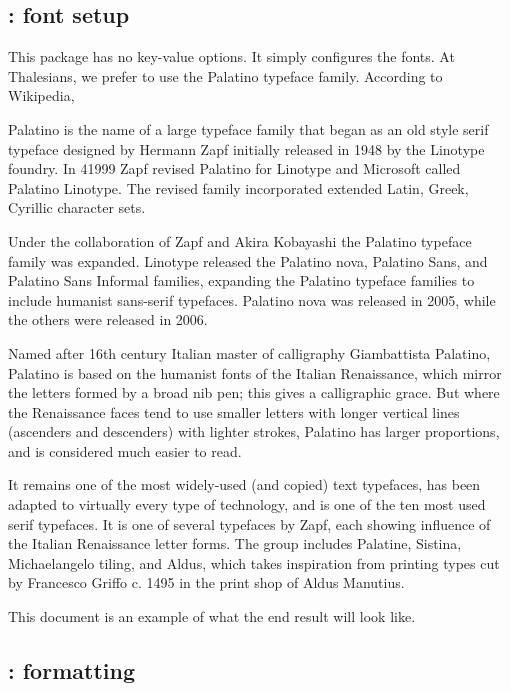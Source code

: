 \subsection{: font setup}

This package has no key-value options. It simply configures the fonts. At Thalesians, we prefer to use the Palatino typeface family. According to Wikipedia,
\begin{longquote}
Palatino is the name of a large typeface family that began as an old style serif typeface designed by Hermann Zapf initially released in 1948 by the Linotype foundry. In 41999 Zapf revised Palatino for Linotype and Microsoft called Palatino Linotype. The revised family incorporated extended Latin, Greek, Cyrillic character sets.

Under the collaboration of Zapf and Akira Kobayashi the Palatino typeface family was expanded. Linotype released the Palatino nova, Palatino Sans, and Palatino Sans Informal families, expanding the Palatino typeface families to include humanist sans-serif typefaces. Palatino nova was released in 2005, while the others were released in 2006.

Named after 16th century Italian master of calligraphy Giambattista Palatino, Palatino is based on the humanist fonts of the Italian Renaissance, which mirror the letters formed by a broad nib pen; this gives a calligraphic grace. But where the Renaissance faces tend to use smaller letters with longer vertical lines (ascenders and descenders) with lighter strokes, Palatino has larger proportions, and is considered much easier to read.

It remains one of the most widely-used (and copied) text typefaces, has been adapted to virtually every type of technology, and is one of the ten most used serif typefaces. It is one of several typefaces by Zapf, each showing influence of the Italian Renaissance letter forms. The group includes Palatine, Sistina, Michaelangelo tiling, and Aldus, which takes inspiration from printing types cut by Francesco Griffo c. 1495 in the print shop of Aldus Manutius.
\end{longquote}

This document is an example of what the end result will look like.

\subsection{: formatting}

